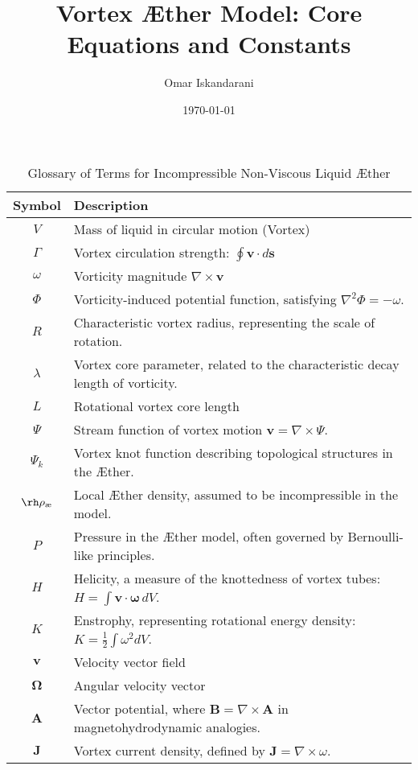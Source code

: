 \documentclass[a4paper,10pt]{article}
\title{Vortex Æther Model: Core Equations and Constants}
\author{Omar Iskandarani}
\date{\today}
\begin{document}
    \maketitle
    \begin{table}[htbp]
        \centering
        \renewcommand{\arraystretch}{1.0}
        \begin{tabular}{c l}
            \toprule
            Symbol & Description \\
            \midrule
            \( V \) & Mass of liquid in circular motion (Vortex) \\
            \( \Gamma \) & Vortex circulation strength: \( \oint \mathbf{v} \cdot d\mathbf{s} \) \\
            \( \omega \) & Vorticity magnitude \(\nabla \times \mathbf{v} \) \\
            \( \Phi \) & Vorticity-induced potential function, satisfying \( \nabla^2 \Phi = -\omega \). \\
            \( R \) & Characteristic vortex radius, representing the scale of rotation. \\
            \( \lambda \) & Vortex core parameter, related to the characteristic decay length of vorticity. \\
            \( L \) & Rotational vortex core length \\
            \( \Psi \) & Stream function of vortex motion \( \mathbf{v} = \nabla \times \Psi \). \\
            \( \Psi_k \) & Vortex knot function describing topological structures in the Æther. \\
            \( \rh\rho_\text{\ae} \) & Local Æther density, assumed to be incompressible in the model. \\
            \( P \) & Pressure in the Æther model, often governed by Bernoulli-like principles. \\
            \( H \) & Helicity, a measure of the knottedness of vortex tubes: \( H = \int \mathbf{v} \cdot \mathbf{\omega} \, dV \). \\
            \( K \) & Enstrophy, representing rotational energy density: \( K = \frac{1}{2} \int \omega^2 dV \). \\
            \( \mathbf{v} \) & Velocity vector field \\
            \( \mathbf{\Omega} \) & Angular velocity vector \\
            \( \mathbf{A} \) & Vector potential, where \( \mathbf{B} = \nabla \times \mathbf{A} \) in magnetohydrodynamic analogies. \\
            \( \mathbf{J} \) & Vortex current density, defined by \( \mathbf{J} = \nabla \times \omega \). \\
            \bottomrule
        \end{tabular}
        \caption{Glossary of Terms for Incompressible Non-Viscous Liquid Æther}
        \label{tab:symbols}
    \end{table}
\end{document}
